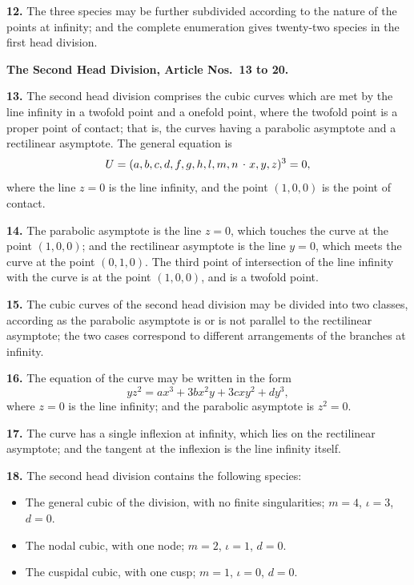 \documentclass[11pt,a4paper]{article}
\theoremstyle{plain}
\theoremstyle{definition}
\newcommand{\lc}{\kern.17em\raise.5ex\hbox{.}\kern.08em}  %
\begin{document}
\textbf{12.} The three species may be further subdivided according to the nature of the points at infinity; and the complete enumeration gives twenty-two species in the first head division.

\bigskip

\noindent\textbf{The Second Head Division, Article Nos.~13 to 20.}

\medskip

\textbf{13.} The second head division comprises the cubic curves which are met by the line infinity in a twofold point and a onefold point, where the twofold point is a proper point of contact; that is, the curves having a parabolic asymptote and a rectilinear asymptote. The general equation is
\[
U = (a, b, c, d, f, g, h, l, m, n \mathbin{\lc} x, y, z)^3 = 0,
\]
where the line $z = 0$ is the line infinity, and the point $(1, 0, 0)$ is the point of contact.

\textbf{14.} The parabolic asymptote is the line $z = 0$, which touches the curve at the point $(1, 0, 0)$; and the rectilinear asymptote is the line $y = 0$, which meets the curve at the point $(0, 1, 0)$. The third point of intersection of the line infinity with the curve is at the point $(1, 0, 0)$, and is a twofold point.

\textbf{15.} The cubic curves of the second head division may be divided into two classes, according as the parabolic asymptote is or is not parallel to the rectilinear asymptote; the two cases correspond to different arrangements of the branches at infinity.

\textbf{16.} The equation of the curve may be written in the form
\[
yz^2 = ax^3 + 3bx^2y + 3cxy^2 + dy^3,
\]
where $z = 0$ is the line infinity; and the parabolic asymptote is $z^2 = 0$.

\textbf{17.} The curve has a single inflexion at infinity, which lies on the rectilinear asymptote; and the tangent at the inflexion is the line infinity itself.

\textbf{18.} The second head division contains the following species:
\begin{itemize}
\item[(1)] The general cubic of the division, with no finite singularities; $m = 4$, $\iota = 3$, $d = 0$.
\item[(2)] The nodal cubic, with one node; $m = 2$, $\iota = 1$, $d = 0$.
\item[(3)] The cuspidal cubic, with one cusp; $m = 1$, $\iota = 0$, $d = 0$.
\end{itemize}
\end{document}
